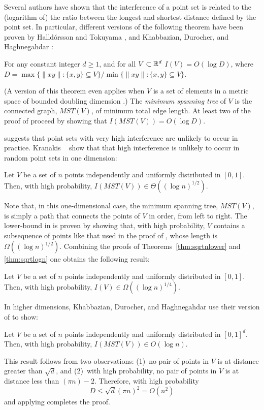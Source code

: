 \documentclass{patmorin}
\newcommand{\mst}{\mathit{MST}}
\begin{document}
Several authors have shown that the interference of a point set is
related to the (logarithm of) the ratio between the longest and shortest
distance defined by the point set.  In particular, different versions
of the following theorem have been proven by Halld\'orsson and Tokuyama
\cite{ht08}, and Khabbazian, Durocher, and Haghnegahdar
\cite{kdh11}:
\begin{thm}
  For any constant integer $d\ge 1$, and for all $V\subset\mathbb{R}^d$
  $I(V)=O(\log D)$, where $D=\max\{\|xy\|: \{x,y\}\subseteq V\}/\min\{\|xy\|:
  \{x,y\}\subseteq V\}$.
\end{thm}
(A version of this theorem even applies when $V$ is a set of elements in a metric space of bounded doubling dimension \cite{msz11}.)
The \emph{minimum spanning tree} of $V$ is the connected graph, $\mst(V)$,
of minimum total edge length.  At least two of the proof of  proceed by showing that $I(\mst(V))=O(\log D)$.

 suggests that point sets with very high interference are
unlikely to occur in practice.  Kranakis \etal\ \cite{kkmns10} show
that that high interference is unlikely to occur in random point sets
in one dimension:
\begin{thm}
  Let $V$ be a set of $n$ points independently and uniformly distributed
  in $[0,1]$.  Then, with high probability, $I(\mst(V))\in \Theta((\log
  n)^{1/2})$.
\end{thm}
Note that, in this one-dimensional case, the minimum spanning tree,
$\mst(V)$, is simply a path that connects the points of $V$ in order,
from left to right.  The lower-bound in  is proven
by showing that, with high probability, $V$ contains a subsequence
of points like that used in the proof of ,
whose length is $\Omega((\log n)^{1/2})$.  Combining the proofs of
Theorems~\ref{thm:sqrtnlower} and \ref{thm:sqrtlogn} one obtains the
following result:
\begin{thm}
  Let $V$ be a set of $n$ points independently and uniformly distributed
  in $[0,1]$.  Then, with high probability, $I(V)\in \Omega((\log
  n)^{1/4})$.
\end{thm}

In higher dimensions, Khabbazian, Durocher, and Haghnegahdar use their
version of  to show:
\begin{thm}
  Let $V$ be a set of $n$ points independently and uniformly distributed
  in $[0,1]^d$.  Then, with high probability, $I(\mst(V))\in O(\log n)$.
\end{thm}
This result follows from two observations: (1)~no pair of points in $V$
is at distance greater than $\sqrt{d}$, and (2)~with high probability,
no pair of points in $V$ is at distance less than $(\pi n)-2$.  Therefore,
with high probability
\[
   D \le \sqrt{d}(\pi n)^2 = O(n^2)
\]
and applying  completes the proof.
\end{document}
